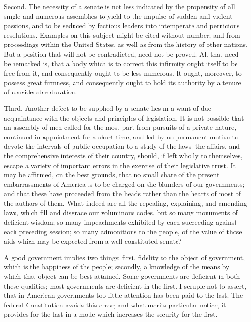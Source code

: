 Second. 
The necessity of a senate is not less indicated by the propensity of all single and numerous assemblies to yield to the impulse of sudden and violent passions, and to be seduced by factious leaders into intemperate and pernicious resolutions. 
Examples on this subject might be cited without number; and from proceedings within the United States, as well as from the history of other nations. 
But a position that will not be contradicted, need not be proved. 
All that need be remarked is, that a body which is to correct this infirmity ought itself to be free from it, and consequently ought to be less numerous. 
It ought, moreover, to possess great firmness, and consequently ought to hold its authority by a tenure of considerable duration.

Third. 
Another defect to be supplied by a senate lies in a want of due acquaintance with the objects and principles of legislation. 
It is not possible that an assembly of men called for the most part from pursuits of a private nature, continued in appointment for a short time, and led by no permanent motive to devote the intervals of public occupation to a study of the laws, the affairs, and the comprehensive interests of their country, should, if left wholly to themselves, escape a variety of important errors in the exercise of their legislative trust. 
It may be affirmed, on the best grounds, that no small share of the present embarrassments of America is to be charged on the blunders of our governments; and that these have proceeded from the heads rather than the hearts of most of the authors of them. 
What indeed are all the repealing, explaining, and amending laws, which fill and disgrace our voluminous codes, but so many monuments of deficient wisdom; so many impeachments exhibited by each succeeding against each preceding session; so many admonitions to the people, of the value of those aids which may be expected from a well-constituted senate?

A good government implies two things: first, fidelity to the object of government, which is the happiness of the people; secondly, a knowledge of the means by which that object can be best attained. 
Some governments are deficient in both these qualities; most governments are deficient in the first. 
I scruple not to assert, that in American governments too little attention has been paid to the last. 
The federal Constitution avoids this error; and what merits particular notice, it provides for the last in a mode which increases the security for the first.

